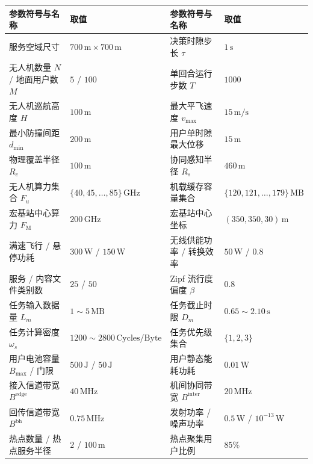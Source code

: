 \begin{table}[!htbp]
    \centering
    \label{tab:ch3-params}
    \footnotesize
    \begin{tabularx}{\textwidth}{XXXX}
        \toprule
        参数符号与名称 & 取值 & 参数符号与名称 & 取值 \\
        \midrule
        服务空域尺寸 & $700\,\mathrm{m}\times700\,\mathrm{m}$ & 决策时隙步长 $\tau$ & $1\,\mathrm{s}$ \\
        无人机数量 $N$ / 地面用户数 $M$ & $5$ / $100$ & 单回合运行步数 $T$ & $1000$ \\
        无人机巡航高度 $H$ & $100\,\mathrm{m}$ & 最大平飞速度 $v_{\max}$ & $15\,\mathrm{m/s}$ \\
        最小防撞间距 $d_{\min}$ & $200\,\mathrm{m}$ & 用户单时隙最大位移 & $15\,\mathrm{m}$ \\
        物理覆盖半径 $R_c$ & $100\,\mathrm{m}$ & 协同感知半径 $R_s$ & $460\,\mathrm{m}$ \\
        无人机算力集合 $F_u$ & $\{40, 45, \dots, 85\}\,\mathrm{GHz}$ & 机载缓存容量集合 & $\{120, 121, \dots, 179\}\,\mathrm{MB}$ \\
        宏基站中心算力 $F_{\mathrm M}$ & $200\,\mathrm{GHz}$ & 宏基站中心坐标 & $(350, 350, 30)\,\mathrm{m}$ \\
        满速飞行 / 悬停功耗 & $300\,\mathrm{W}$ / $150\,\mathrm{W}$ & 无线供能功率 / 转换效率 & $50\,\mathrm{W}$ / $0.8$ \\
        服务 / 内容文件类别数 & $25$ / $50$ & Zipf 流行度偏度 $\beta$ & $0.8$ \\
        任务输入数据量 $L_m$ & $1\sim 5\,\mathrm{MB}$ & 任务截止时限 $D_m$ & $0.65\sim 2.10\,\mathrm{s}$ \\
        任务计算密度 $\omega_s$ & $1200\sim 2800\,\text{Cycles/Byte}$ & 任务优先级集合 & $\{1, 2, 3\}$ \\
        用户电池容量 $B_{\max}$ / 门限 & $500\,\mathrm{J}$ / $50\,\mathrm{J}$ & 用户静态能耗功耗 & $0.01\,\mathrm{W}$ \\
        接入信道带宽 $B^{\mathrm{edge}}$ & $40\,\mathrm{MHz}$ & 机间协同带宽 $B^{\mathrm{inter}}$ & $20\,\mathrm{MHz}$ \\
        回传信道带宽 $B^{\mathrm{bh}}$ & $0.75\,\mathrm{MHz}$ & 发射功率 / 噪声功率 & $0.5\,\mathrm{W}$ / $10^{-13}\,\mathrm{W}$ \\
        热点数量 / 热点服务半径 & $2$ / $100\,\mathrm{m}$ & 热点聚集用户比例 & $85\%$ \\
        \bottomrule
    \end{tabularx}
\end{table}

